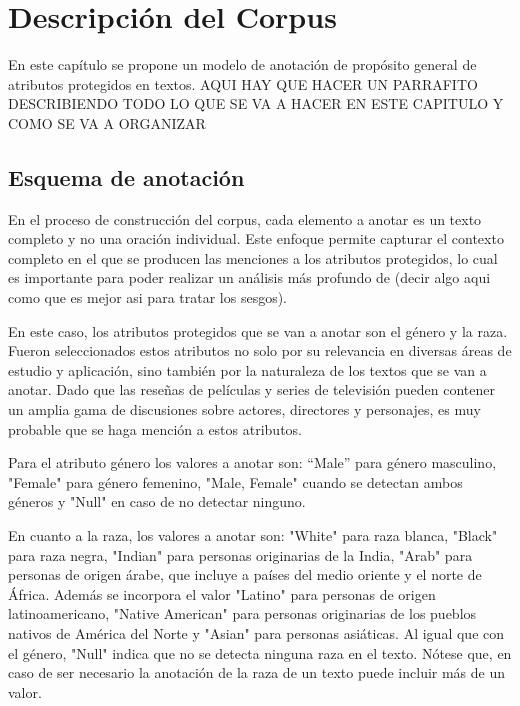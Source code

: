 \chapter{Descripci\'on del Corpus}\label{chapter:proposal}
En este cap\'itulo se propone un modelo de anotaci\'on de prop\'osito general de atributos protegidos
en textos. 
AQUI HAY QUE HACER UN PARRAFITO DESCRIBIENDO TODO LO QUE SE VA A HACER EN ESTE CAPITULO Y COMO SE VA A ORGANIZAR

\section{Esquema de anotaci\'on}
En el proceso de construcci\'on del corpus, cada elemento a anotar es un texto completo y no una oraci\'on individual. 
Este enfoque permite capturar el contexto completo en el que se producen las menciones a los atributos protegidos, 
lo cual es importante para poder realizar un an\'alisis m\'as profundo de (decir algo aqui como que es mejor asi para tratar los sesgos).

En este caso, los atributos protegidos que se van a anotar son el g\'enero y la raza.
Fueron seleccionados estos atributos no solo por su relevancia en diversas \'areas de estudio y aplicaci\'on, sino tambi\'en 
por la naturaleza de los textos que se van a anotar. Dado que las rese\~nas de pel\'iculas y series de televisi\'on
pueden contener un amplia gama de discusiones sobre actores, directores y personajes, es muy probable que se haga menci\'on a 
estos atributos.

Para el atributo g\'enero los valores a anotar son: ``Male'' para g\'enero masculino, "Female" para g\'enero femenino, 
"Male, Female" cuando se detectan ambos g\'eneros y "Null" en caso de no detectar ninguno.

En cuanto a la raza, los valores a anotar son: "White" para raza blanca, "Black" para raza negra, "Indian" para 
personas originarias de la India, "Arab" para personas de origen \'arabe, que incluye a pa\'ises del medio oriente y el norte de \'Africa.
Adem\'as se incorpora el valor "Latino" para personas de origen latinoamericano, "Native American" para personas originarias de 
los pueblos nativos de Am\'erica del Norte y "Asian" para personas asi\'aticas. Al igual que con el g\'enero, "Null" indica que no se detecta
ninguna raza en el texto. N\'otese que, en caso de ser necesario la anotaci\'on de la raza de un texto puede incluir m\'as de un valor.


